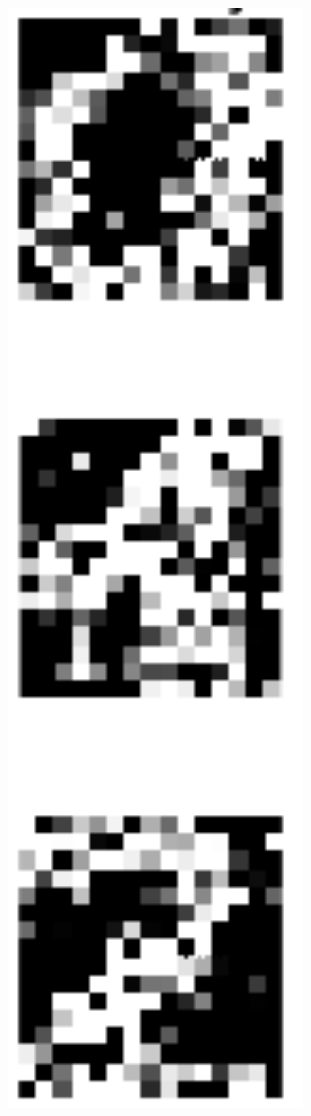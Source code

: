 \documentclass[pdftex,11pt,a4paper]{article}
\begin{document}
\begin{figure}[htb]
\begin{minipage}{0.08\textwidth}
\end{minipage}%
\begin{minipage}{0.08\textwidth}
\includegraphics[width=0.9\textwidth]{figs/noisy_digits.png}

\end{minipage}
\end{figure}
\end{document}
